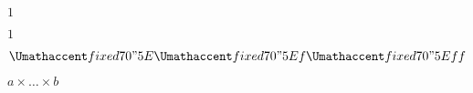 \documentclass{article}
\def\hat{\Umathaccent fixed 7 0 "5E\relax}
\begin{document}
$1$

{\Huge $1$}

$\hat{\hat{f}}\hat{f}f$


$a \times \dots \times b$
\end{document}
